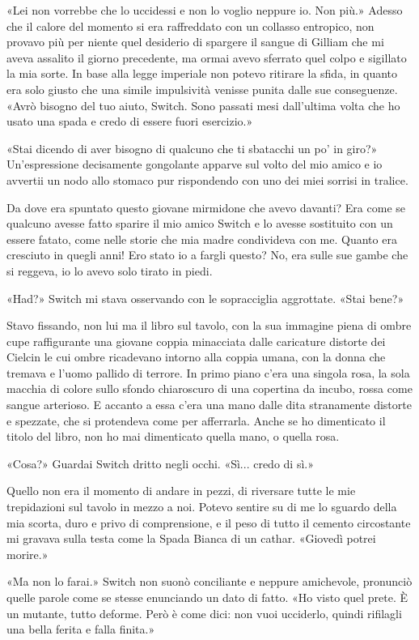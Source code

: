 «Lei non vorrebbe che lo uccidessi e non lo voglio neppure io. Non più.»
Adesso che il calore del momento si era raffreddato con un collasso
entropico, non provavo più per niente quel desiderio di spargere il
sangue di Gilliam che mi aveva assalito il giorno precedente, ma ormai
avevo sferrato quel colpo e sigillato la mia sorte. In base alla legge
imperiale non potevo ritirare la sfida, in quanto era solo giusto che
una simile impulsività venisse punita dalle sue conseguenze. «Avrò
bisogno del tuo aiuto, Switch. Sono passati mesi dall'ultima volta che
ho usato una spada e credo di essere fuori esercizio.»

«Stai dicendo di aver bisogno di qualcuno che ti sbatacchi un po' in
giro?» Un'espressione decisamente gongolante apparve sul volto del mio
amico e io avvertii un nodo allo stomaco pur rispondendo con uno dei
miei sorrisi in tralice.

Da dove era spuntato questo giovane mirmidone che avevo davanti? Era
come se qualcuno avesse fatto sparire il mio amico Switch e lo avesse
sostituito con un essere fatato, come nelle storie che mia madre
condivideva con me. Quanto era cresciuto in quegli anni! Ero stato io a
fargli questo? No, era sulle sue gambe che si reggeva, io lo avevo solo
tirato in piedi.

«Had?» Switch mi stava osservando con le sopracciglia aggrottate. «Stai
bene?»

Stavo fissando, non lui ma il libro sul tavolo, con la sua immagine
piena di ombre cupe raffigurante una giovane coppia minacciata dalle
caricature distorte dei Cielcin le cui ombre ricadevano intorno alla
coppia umana, con la donna che tremava e l'uomo pallido di terrore. In
primo piano c'era una singola rosa, la sola macchia di colore sullo
sfondo chiaroscuro di una copertina da incubo, rossa come sangue
arterioso. E accanto a essa c'era una mano dalle dita stranamente
distorte e spezzate, che si protendeva come per afferrarla. Anche se ho
dimenticato il titolo del libro, non ho mai dimenticato quella mano, o
quella rosa.

«Cosa?» Guardai Switch dritto negli occhi. «Sì... credo di sì.»

Quello non era il momento di andare in pezzi, di riversare tutte le mie
trepidazioni sul tavolo in mezzo a noi. Potevo sentire su di me lo
sguardo della mia scorta, duro e privo di comprensione, e il peso di
tutto il cemento circostante mi gravava sulla testa come la Spada Bianca
di un cathar. «Giovedì potrei morire.»

«Ma non lo farai.» Switch non suonò conciliante e neppure amichevole,
pronunciò quelle parole come se stesse enunciando un dato di fatto. «Ho
visto quel prete. È un mutante, tutto deforme. Però è come dici: non
vuoi ucciderlo, quindi rifilagli una bella ferita e falla finita.»

